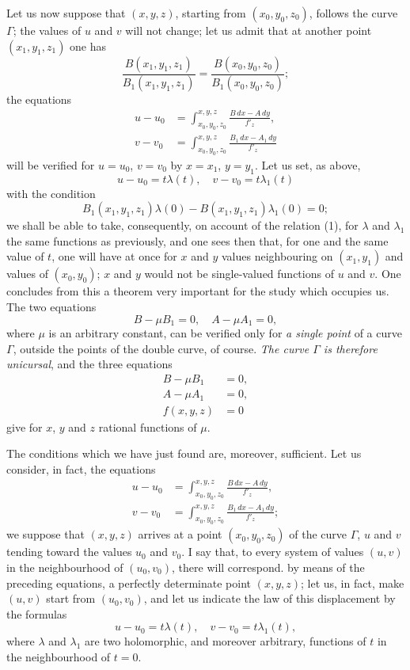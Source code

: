 \documentclass{article}
\begin{document}
Let us now suppose that $(x, y, z)$, starting from $(x_{0}, y_{0}, z_{0})$, follows the curve $\Gamma$; the values of $u$ and $v$ will not change; let us admit that at another point $(x_{1}, y_{1}, z_{1})$ one has
\[
\frac{B(x_{1}, y_{1}, z_{1})}{B_{1}(x_{1}, y_{1}, z_{1})} = \frac{B(x_{0}, y_{0}, z_{0})}{B_{1}(x_{0}, y_{0}, z_{0})}; \tag{1}
\]
the equations
\[
\begin{aligned}
u - u_{0} &= \int_{x_{0}, y_{0}, z_{0}}^{x, y, z} \frac{B\,dx - A\,dy}{f'_{z}}, \\
v - v_{0} &= \int_{x_{0}, y_{0}, z_{0}}^{x, y, z} \frac{B_{1}\,dx - A_{1}\,dy}{f'_{z}}
\end{aligned}
\]
will be verified for $u = u_{0}$, $v = v_{0}$ by $x = x_{1}$, $y = y_{1}$. Let us set, as above,
\[
u - u_{0} = t\lambda(t), \quad v - v_{0} = t\lambda_{1}(t)
\]
with the condition
\[
B_{1}(x_{1}, y_{1}, z_{1})\lambda(0) - B(x_{1}, y_{1}, z_{1})\lambda_{1}(0) = 0;
\]
we shall be able to take, consequently, on account of the relation (1), for $\lambda$ and $\lambda_{1}$ the same functions as previously, and one sees then that, for one and the same value of $t$, one will have at once for $x$ and $y$ values neighbouring
on $(x_{1}, y_{1})$ and values of $(x_{0}, y_{0})$; $x$ and $y$ would not be single-valued functions of $u$ and $v$. One concludes from this a theorem very important for the study which occupies us. The two equations
\[
B - \mu B_{1} = 0, \quad A - \mu A_{1} = 0,
\]
where $\mu$ is an arbitrary constant, can be verified only for \emph{a single point} of a curve $\Gamma$, outside the points of the double curve, of course. \emph{The curve $\Gamma$ is therefore unicursal}, and the three equations
\[
\begin{aligned}
B - \mu B_{1} &= 0, \\
A - \mu A_{1} &= 0, \\
f(x, y, z) &= 0
\end{aligned}
\]
give for $x$, $y$ and $z$ rational functions of $\mu$.

The conditions which we have just found are, moreover, sufficient. Let us consider, in fact, the equations
\[
\begin{aligned}
u - u_{0} &= \int_{x_{0}, y_{0}, z_{0}}^{x, y, z} \frac{B\,dx - A\,dy}{f'_{z}}, \\
v - v_{0} &= \int_{x_{0}, y_{0}, z_{0}}^{x, y, z} \frac{B_{1}\,dx - A_{1}\,dy}{f'_{z}};
\end{aligned}
\]
we suppose that $(x, y, z)$ arrives at a point $(x_{0}, y_{0}, z_{0})$ of the curve $\Gamma$, $u$ and $v$ tending toward the values $u_{0}$ and $v_{0}$. I say that, to every system of values $(u, v)$ in the neighbourhood of $(u_{0}, v_{0})$, there will correspond. by means of the preceding equations, a perfectly determinate point $(x, y, z)$; let us, in fact, make $(u, v)$ start from $(u_{0}, v_{0})$, and let us indicate the law of this displacement by the formulas
\[
u - u_{0} = t\lambda(t), \quad v - v_{0} = t\lambda_{1}(t),
\]
where $\lambda$ and $\lambda_{1}$ are two holomorphic, and moreover arbitrary, functions of $t$ in the neighbourhood of $t = 0$.
\end{document}
